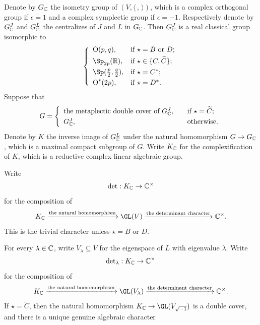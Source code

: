 \documentclass[11pt,a4paper]{amsart}
\newcommand{\oO}{\operatorname{O}}
\newcommand{\R}{\mathbb R}
\newcommand{\la}{\langle}
\newcommand{\ra}{\rangle}
\newcommand{\be}{\begin {equation}}
\newcommand{\ee}{\end {equation}}
\numberwithin{equation}{section}
\theoremstyle{remark}
\def\subset{\subseteq}
\begin{document}
Denote by $G_{\mathbb{C}}$ the isometry group of $ (V, \la\,,\,\ra)$, which is a complex orthogonal group if $\epsilon=1$ and a complex symplectic group if $\epsilon=-1$. Respectively denote by  $G_{\C}^{J}$  and  $G_{\mathbb{C}}^{L}$ the centralizes of $J$ and $L$ in  $G_{\mathbb{C}}$. Then $G_{\C}^{J}$ is a real classical group isomorphic to
\[
 \left\{
     \begin{array}{ll}
         \oO(p, q), &\hbox{if $\star=B$ or $D$}; \smallskip\\
            \Sp_{2p}(\R), &\hbox{if $\star\in \{C,\widetilde C\}$}; \smallskip\\
                   \Sp(\frac{p}{2}, \frac{q}{2}), &\hbox{if $\star=C^*$}; \smallskip \\
          \oO^*(2p), &\hbox{if $\star=D^*$}.\\
            \end{array}
   \right.
\]
Suppose that
\be\label{defg}
G= \left\{
     \begin{array}{ll}
       \textrm{the metaplectic double cover of $G_{\C}^{J}$}, \quad &\hbox{if $\star=\widetilde C$}; \smallskip\\
            G_{\C}^{J},  \quad  &\hbox{otherwise}.\\
            \end{array}
   \right.
\ee
Denote by $K$ the inverse image of  $G_{\mathbb{C}}^{L}$  under the natural homomorphism $G\rightarrow G_{\mathbb{C}}$, which is a maximal compact subgroup of $G$. Write $K_{\mathbb{C}}$ for the complexification of  $K$, which is a reductive complex linear algebraic group.

Write
\be\label{comdet}
{\det} : K_{\C}\rightarrow \C^\times
\ee
for the composition of
\[
   K_{\C}\xrightarrow{\textrm{the natural homomorphism}} \GL(V)\xrightarrow{\textrm{the determinant character}}\C^\times.
\]
This is the trivial character unless $\star=B$ or $D$.

For every $\lambda\in \mathbb{C}$, write $V_{\lambda}\subset V$ for the eigenspace of $L$ with eigenvalue $\lambda$. Write
\be\label{comdetlam}
{\det}_\lambda : K_{\C}\rightarrow \C^\times
\ee
for the composition of
\begin{equation*}\label{dethalf0}
   K_{\C}\xrightarrow{\textrm{the natural homomorphism}} \GL(V_{\lambda})\xrightarrow{\textrm{the determinant character}}\C^\times.
\end{equation*}
If $\star=\widetilde C$, then the natural homomorphism  $ K_{\C}\rightarrow \GL(V_{\sqrt{-1}})$ is a double cover, and there is a unique genuine algebraic character
\end{document}
